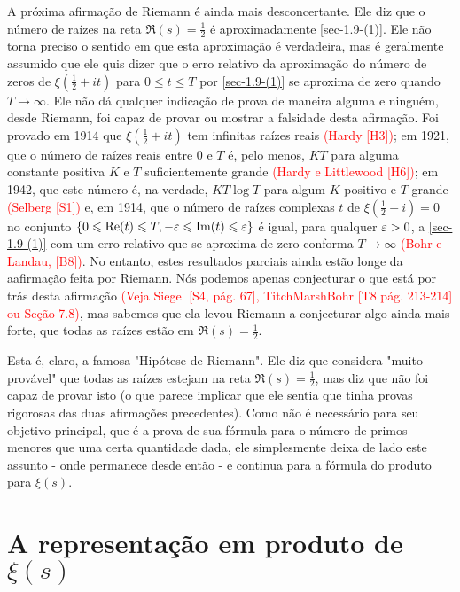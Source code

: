     A próxima afirmação de Riemann é ainda mais desconcertante. Ele diz que o número de raízes na reta $\Re(s) = \frac{1}{2}$ é aproximadamente \eqref{sec-1.9-(1)}. Ele não torna preciso o sentido em que esta aproximação é verdadeira, mas é geralmente assumido que ele quis dizer que o erro relativo da aproximação do número de zeros de $\xi(\frac{1}{2} + it)$ para $0 \leq t \leq T$ por \eqref{sec-1.9-(1)} se aproxima de zero quando $T \to \infty$. Ele não dá qualquer indicação de prova de maneira alguma e ninguém, desde Riemann, foi capaz de provar ou mostrar a falsidade desta afirmação. Foi provado em 1914 que $\xi(\frac{1}{2} + it)$ tem infinitas raízes reais \textcolor{red}{(Hardy [H3])}; em 1921, que o número de raízes reais entre 0 e $T$ é, pelo menos, $KT$ para alguma constante positiva $K$ e $T$ suficientemente grande \textcolor{red}{(Hardy e Littlewood [H6])}; em 1942, que este número é, na verdade, $KT \log T$ para algum $K$ positivo e $T$ grande \textcolor{red}{(Selberg [S1])} e, em 1914, que o número de raízes complexas $t$ de $\xi(\frac{1}{2} + i) = 0$ no conjunto $\{0 \leqslant \mathrm{Re}(t) \leqslant T, -\varepsilon \leqslant \mathrm{Im}(t) \leqslant \varepsilon \}$ é igual, para qualquer $\varepsilon > 0$, a \eqref{sec-1.9-(1)} com um erro relativo que se aproxima de zero conforma $T \to \infty$ \textcolor{red}{(Bohr e Landau, [B8])}. No entanto, estes resultados parciais ainda estão longe da aafirmação feita por Riemann. Nós podemos apenas conjecturar o que está por trás desta afirmação \textcolor{red}{(Veja Siegel [S4, pág. 67], TitchMarshBohr [T8 pág. 213-214] ou Seção 7.8)}, mas sabemos que ela levou Riemann a conjecturar algo ainda mais forte, que todas as raízes estão em $\Re(s) = \frac{1}{2}$.
    
    Esta é, claro, a famosa "Hipótese de Riemann". Ele diz que considera "muito provável" que todas as raízes estejam na reta $\Re(s) = \frac{1}{2}$, mas diz que não foi capaz de provar isto (o que parece implicar que ele sentia que tinha provas rigorosas das duas afirmações precedentes). Como não é necessário para seu objetivo principal, que é a prova de sua fórmula para o número de primos menores que uma certa quantidade dada, ele simplesmente deixa de lado este assunto - onde permanece desde então - e continua para a fórmula do produto para $\xi(s)$.

    
    \section{A representação em produto de $\xi(s)$}
    
